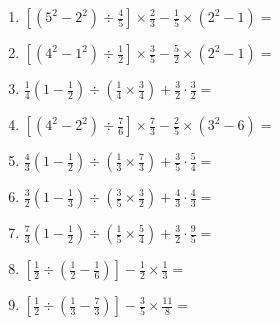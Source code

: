 \documentclass[12pt]{article}
\begin{document}
\begin{enumerate}[ itemsep=1.5cm]
	\item $\displaystyle \left[ \left( 5^2 - 2^2 \right) \div \frac{4}{5} \right] \times \frac{2}{3} - \frac{1}{5} \times \left( 2^2 - 1 \right) =$
	\item $\displaystyle \left[ \left( 4^2 - 1^2 \right) \div \frac{1}{2} \right] \times \frac{3}{5} - \frac{5}{2} \times \left( 2^2 - 1 \right) =$
	\item $\displaystyle \frac{1}{4} \left( 1 - \frac{1}{2} \right) \div \left( \frac{1}{4} \times \frac{3}{4} \right) + \frac{3}{2} \cdot \frac{3}{2} =$
	\item $\displaystyle \left[ \left( 4^2 - 2^2 \right) \div \frac{7}{6} \right] \times \frac{7}{3} - \frac{2}{5} \times \left( 3^2 - 6 \right) =$
	\item $\displaystyle \frac{4}{3} \left( 1 - \frac{1}{2} \right) \div \left( \frac{1}{3} \times \frac{7}{3} \right) + \frac{3}{5} \cdot \frac{5}{4} =$
	\item $\displaystyle \frac{3}{2} \left( 1 - \frac{1}{3} \right) \div \left( \frac{3}{5} \times \frac{3}{2} \right) + \frac{4}{3} \cdot \frac{4}{3} =$
	\item $\displaystyle \frac{7}{3} \left( 1 - \frac{1}{2} \right) \div \left( \frac{1}{5} \times \frac{5}{4} \right) + \frac{3}{2} \cdot \frac{9}{5} =$
	\item $\displaystyle \left[ \frac{1}{2} \div \left( \frac{1}{2} - \frac{1}{6} \right) \right] - \frac{1}{2} \times \frac{1}{3} =$
	\item $\displaystyle \left[ \frac{1}{2} \div \left( \frac{1}{3} - \frac{7}{3} \right) \right] - \frac{3}{5} \times \frac{11}{8} =$


\end{enumerate}
\end{document}
